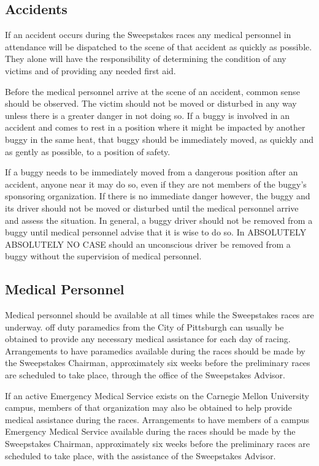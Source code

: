 \subsection{Accidents}

If an accident occurs during the Sweepstakes races any medical personnel in attendance will be dispatched to the scene of that accident as quickly as possible. They alone will have the responsibility of determining the condition of any victims and of providing any needed first aid.

Before the medical personnel arrive at the scene of an accident, common sense should be observed. The victim should not be moved or disturbed in any way unless there is a greater danger in not doing so. If a buggy is involved in an accident and comes to rest in a position where it might be impacted by another buggy in the same heat, that buggy should be immediately moved, as quickly and as gently as possible, to a position of safety.

If a buggy needs to be immediately moved from a dangerous position after an accident, anyone near it may do so, even if they are not members of the buggy's sponsoring organization. If there is no immediate danger however, the buggy and its driver should not be moved or disturbed until the medical personnel arrive and assess the situation. In general, a buggy driver should not be removed from a buggy until medical personnel advise that it is wise to do so. In ABSOLUTELY ABSOLUTELY NO CASE should an unconscious driver be removed from a buggy without the supervision of medical personnel.

\subsection{Medical Personnel}

Medical personnel should be available at all times while the Sweepstakes races are underway. off duty paramedics from the City of Pittsburgh can usually be obtained to provide any necessary medical assistance for each day of racing. Arrangements to have paramedics available during the races should be made by the Sweepstakes Chairman, approximately six weeks before the preliminary races are scheduled to take place, through the office of the Sweepstakes Advisor.

If an active Emergency Medical Service exists on the Carnegie Mellon University campus, members of that organization may also be obtained to help provide medical assistance during the races. Arrangements to have members of a campus Emergency Medical Service available during the races should be made by the Sweepstakes Chairman, approximately six weeks before the preliminary races are scheduled to take place, with the assistance of the Sweepstakes Advisor.

